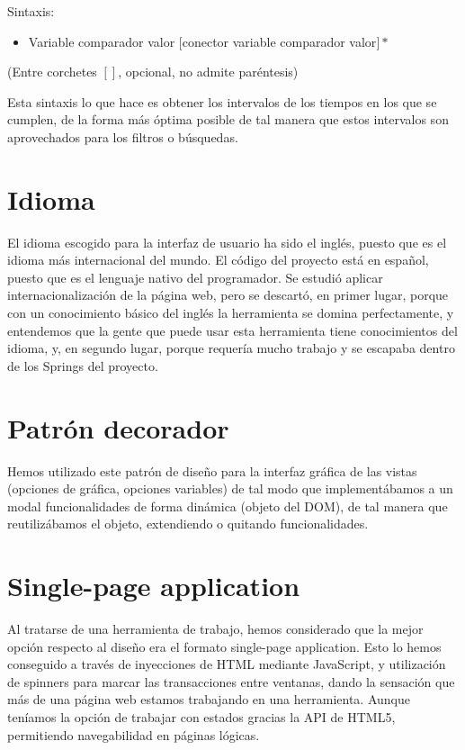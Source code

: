 Sintaxis:
\begin{itemize}
\item Variable comparador valor $[$conector variable comparador valor$]*$
\end{itemize}
(Entre corchetes $[]$, opcional, no admite paréntesis)

Esta sintaxis lo que hace es obtener los intervalos de los tiempos en los que se cumplen, de la forma más óptima posible de tal manera que estos intervalos son aprovechados para los filtros o búsquedas.

\section{Idioma}

El idioma escogido para la interfaz de usuario ha sido el inglés, puesto que es el idioma más internacional del mundo.
El código del proyecto está en español, puesto que es el lenguaje nativo del programador.
Se estudió aplicar internacionalización de la página web, pero se descartó, en primer lugar, porque con un conocimiento básico del inglés la herramienta se domina perfectamente, y entendemos que la gente que puede usar esta herramienta tiene conocimientos del idioma, y, en segundo lugar, porque requería mucho trabajo y se escapaba dentro de los Springs del proyecto.

\section{Patrón decorador}

Hemos utilizado este patrón de diseño para la interfaz gráfica de las vistas (opciones de gráfica, opciones variables) de tal modo que implementábamos a un modal funcionalidades de forma dinámica (objeto del DOM), de tal manera que reutilizábamos el objeto, extendiendo o quitando funcionalidades. \cite{DECORATOR}


 
\section{Single-page application}
Al tratarse de una herramienta de trabajo, hemos considerado que la mejor opción respecto al diseño era el formato single-page application.
Esto lo hemos conseguido a través de inyecciones de HTML mediante JavaScript, y utilización de spinners para marcar las transacciones entre ventanas, dando la sensación que más de una página web estamos trabajando en una herramienta.
Aunque teníamos la opción de trabajar con estados gracias la API de HTML5, permitiendo navegabilidad en páginas lógicas.

